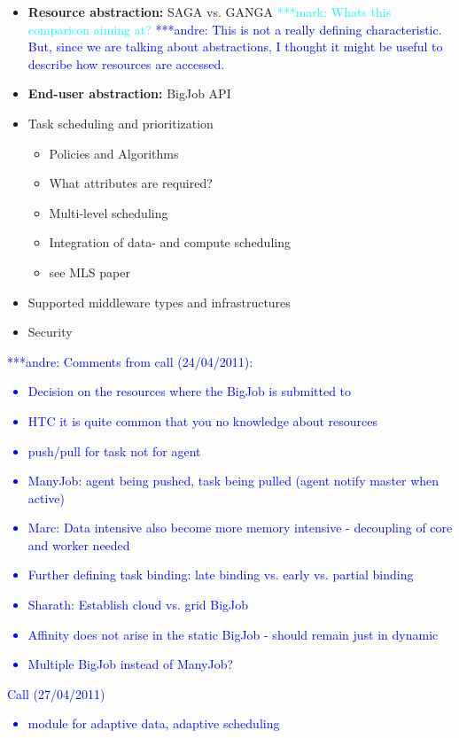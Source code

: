 \documentclass[]{article}
\newcommand{\alnote}[1]{ {\textcolor{blue} { ***andre: #1 }}}
\newcommand{\msnote}[1]{ {\textcolor{cyan} { ***mark: #1 }}}
\newcommand{\alnote}[1]{}
\begin{document}
\begin{itemize}
	\item \textbf{Resource abstraction:} SAGA vs. GANGA
	\msnote{Whats this comparison aiming at?} \alnote{This is not a really 
	defining characteristic. But, since we are talking about abstractions, I 
	thought it might be useful to describe how resources are accessed.}
	\item \textbf{End-user abstraction:} BigJob API
	\item Task scheduling and prioritization
	\begin{itemize}
	 			\item Policies and Algorithms
	 			\item What attributes are required?
	 			\item Multi-level scheduling
	 			\item Integration of data- and compute scheduling
	 			\item see MLS paper
	\end{itemize}
	
	\item Supported middleware types and infrastructures	
	\item Security
\end{itemize}

\alnote{Comments from call (24/04/2011):
\begin{itemize}
	\item Decision on the resources where the BigJob is submitted to
	\item HTC it is quite common that you no knowledge about resources
	\item push/pull for task not for agent
	\item ManyJob: agent being pushed, task being pulled (agent notify master when active)
	\item Marc: Data intensive also become more memory intensive - decoupling of core and worker needed
	\item Further defining task binding: late binding vs. early vs. partial binding	
	\item Sharath: Establish cloud vs. grid BigJob
	\item Affinity does not arise in the static BigJob - should remain just in dynamic
	\item Multiple BigJob instead of ManyJob?
\end{itemize}
Call (27/04/2011)
\begin{itemize}
	\item module for adaptive data, adaptive scheduling    
\end{itemize}
}
\end{document}
